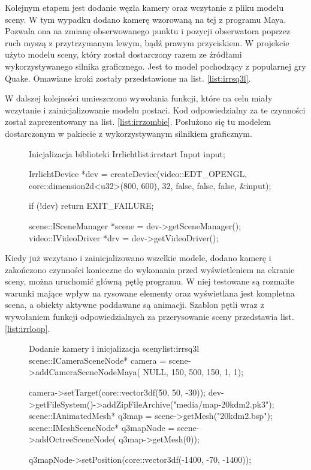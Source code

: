 \documentclass[11pt]{mwrep}
\begin{document}
Kolejnym etapem jest dodanie węzła kamery oraz wczytanie z pliku modelu sceny. W tym wypadku dodano kamerę wzorowaną na tej z programu Maya. Pozwala ona na zmianę obserwowanego punktu i pozycji obserwatora poprzez ruch myszą z przytrzymanym lewym, bądź prawym przyciskiem. W projekcie użyto modelu sceny, który został dostarczony razem ze źródłami wykorzystywanego silnika graficznego. Jest to model pochodzący z popularnej gry Quake. Omawiane kroki zostały przedstawione na list. \ref{list:irrsq3l}.

W dalszej kolejności umieszczono wywołania funkcji, które na celu miały wczytanie i zainicjalizowanie modelu postaci. Kod odpowiedzialny za te czynności został zaprezentowany na list. \ref{list:irrzombie}. Posłużono się tu modelem dostarczonym w pakiecie z wykorzystywanym silnikiem graficznym. 



\begin{figure}
\begin{listing}{Inicjalizacja biblioteki Irrlicht}{list:irrstart}
	Input input;
	
	IrrlichtDevice *dev = createDevice(video::EDT_OPENGL,
			core::dimension2d<u32>(800, 600),
			32, false, false, false, &input);

	if (!dev)
		return EXIT_FAILURE;

	scene::ISceneManager *scene = dev->getSceneManager();
	video::IVideoDriver *drv = dev->getVideoDriver();

\end{listing}
\end{figure}


Kiedy już wczytano i zainicjalizowano wszelkie modele, dodano kamerę i zakończono czynności konieczne do wykonania przed wyświetleniem na ekranie sceny, można uruchomić główną pętlę programu. W niej testowane są rozmaite warunki mające wpływ na rysowane elementy oraz wyświetlana jest kompletna scena, a obiekty aktywne poddawane są animacji. Szablon pętli wraz z wywołaniem funkcji odpowiedzialnych za przerysowanie sceny przedstawia list. \ref{list:irrloop}.

\begin{figure}[p]
\begin{listing}{Dodanie kamery i inicjalizacja sceny}{list:irrsq3l}
	scene::ICameraSceneNode* camera = scene->addCameraSceneNodeMaya(
			NULL, 150, 500, 150, 1, 1);

	camera->setTarget(core::vector3df(50, 50, -30));
	dev->getFileSystem()->addZipFileArchive("media/map-20kdm2.pk3");
	scene::IAnimatedMesh* q3map = scene->getMesh("20kdm2.bsp");
	scene::IMeshSceneNode* q3mapNode = scene->addOctreeSceneNode(
			q3map->getMesh(0));

	q3mapNode->setPosition(core::vector3df(-1400, -70, -1400));
\end{listing}
\end{figure}
\end{document}
